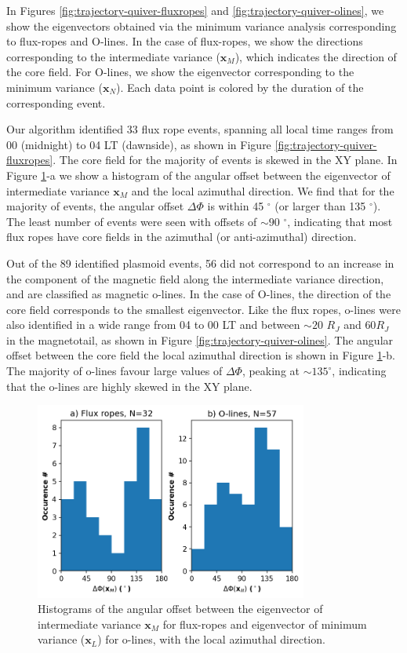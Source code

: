 In Figures \ref{fig:trajectory-quiver-fluxropes} and \ref{fig:trajectory-quiver-olines}, we show the eigenvectors obtained via the minimum variance analysis corresponding to flux-ropes and O-lines. In the case of flux-ropes, we show the directions corresponding to the intermediate variance ($\mathbf{x}_M$), which indicates the direction of the core field. For O-lines, we show the eigenvector corresponding to the minimum variance ($\mathbf{x}_N$). Each data point is colored by the duration of the corresponding event. 

Our algorithm identified 33 flux rope events, spanning all local time ranges from 00 (midnight) to 04 LT (dawnside), as shown in Figure \ref{fig:trajectory-quiver-fluxropes}. The core field for the majority of events is skewed in the XY plane. In Figure \ref{fig:histogram-of-dphi}-a we show a histogram of the angular offset between the eigenvector of intermediate variance $\mathbf{x}_M$ and the local azimuthal direction. We find that for the majority of events, the angular offset $\Delta\Phi$ is within 45 $^\circ$ (or larger than 135 $^\circ$). The least number of events were seen with offsets of $\sim90$ $^\circ$, indicating that most flux ropes have core fields in the azimuthal (or anti-azimuthal) direction.

Out of the 89 identified plasmoid events, 56 did not correspond to an increase in the component of the magnetic field along the intermediate variance direction, and are classified as magnetic o-lines. In the case of O-lines, the direction of the core field corresponds to the smallest eigenvector. Like the flux ropes, o-lines were also identified in a wide range from 04 to 00 LT and between $\sim20$ $R_J$ and $60 R_J$ in the magnetotail, as shown in Figure \ref{fig:trajectory-quiver-olines}. The angular offset between the core field the local azimuthal direction is shown in Figure \ref{fig:histogram-of-dphi}-b. The majority of o-lines favour large values of $\Delta\Phi$, peaking at $\sim135^\circ$, indicating that the o-lines are highly skewed in the XY plane. 

\begin{figure}
    \centering
    \includegraphics[width=0.8\textwidth]{images6/histogram_dphi.png}
    \caption{Histograms of the angular offset between the eigenvector of intermediate variance $\mathbf{x}_M$ for flux-ropes and eigenvector of minimum variance ($\mathbf{x}_L$) for o-lines, with the local azimuthal direction.}
    \label{fig:histogram-of-dphi}
\end{figure}

